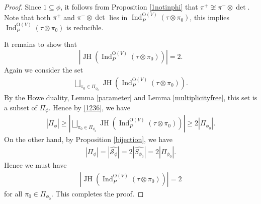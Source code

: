 \documentclass[article]{article}
\numberwithin{equation}{section}
\theoremstyle{definition}
\DeclareMathOperator{\Ind}{Ind}
\DeclareMathOperator{\JH}{JH}
\begin{document}
\begin{proof}
	\begin{comment}
	\begin{align*}
	\theta_{V,W,\psi}(\sigma^+)&=\pi^+ \\
	\theta_{V,W,\psi}(\sigma^-)&=\pi^
	\end{align*}
	\end{comment}
	Since $\mathrm 1\subseteq \phi$, it follows from Proposition \ref{1notinphi} that $\pi^+\not \cong \pi^-\otimes \det$. Note that both $\pi^+$ and $\pi^-\otimes\det$ lies in $\Ind_{P}^{\mathrm O\left(V\right)}\left(\tau\otimes \pi_0\right)$, this implies $\Ind_{P}^{\mathrm O\left(V\right)}\left(\tau \otimes \pi_0\right)$ is reducible.
	
	It remains to show that 
	$$\left|\JH(\Ind_{P}^{\mathrm O(V)}(\tau\otimes \pi_0))\right|=2.$$ 
	Again we consider the set 
	\begin{align*}
	\bigsqcup_{\pi_0\in \Pi_{\phi_0}} \JH(\Ind_{P}^{\mathrm O(V)}(\tau\otimes \pi_0)). 
	\end{align*}
	By the Howe duality, Lemma \ref{parameter} and Lemma \ref{multiplicityfree}, this set is a subset of $\Pi_{\phi}$. Hence by \ref{1236}, we have 
	\begin{align*}
	|\Pi_{\phi}|\geq \left|\bigsqcup_{\pi_0\in \Pi_{\phi_0}} \JH(\Ind_{P}^{\mathrm O(V)}(\tau\otimes \pi_0)) \right|\geq 2|\Pi_{\phi_{0}}|. 
	\end{align*}
	On the other hand, by Proposition \ref{bijection}, we have 
	\begin{align*}
	|\Pi_{\phi}|=|\widehat{\mathcal {S}_{\phi}}|=2|\widehat{S_{\phi_0}}|=2|\Pi_{\phi_{0}}|. 
	\end{align*}
	Hence we must have 
	\begin{align*}
	\left| \JH(\Ind_{P}^{\mathrm O(V)}(\tau\otimes \pi_0)) \right|=2
	\end{align*}
	for all $\pi_0\in \Pi_{\phi_{0}}$. This completes the proof. 
\end{proof}
\end{document}
